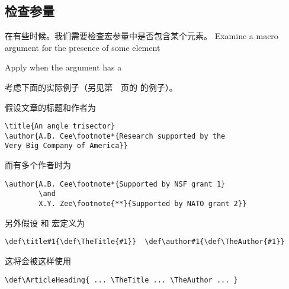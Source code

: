 \documentclass[letterpaper]{book}
\begin{document}
\subsection{检查参量}

在有些时候。我们需要检查宏参量中是否包含某个元素。
\howto Examine a macro argument for the presence of some element\par
\howto Apply  when the argument has a \par
考虑下面的实际例子（另见第~\pageref{left:display}~页的
 的例子）。

假设文章的标题和作者为
\begin{verbatim}
\title{An angle trisector}
\author{A.B. Cee\footnote*{Research supported by the
Very Big Company of America}}
\end{verbatim}
而有多个作者时为
\begin{verbatim}
\author{A.B. Cee\footnote*{Supported by NSF grant 1}
        \and
        X.Y. Zee\footnote{**}{Supported by NATO grant 2}}
\end{verbatim}
另外假设  和  宏定义为
\begin{verbatim}
\def\title#1{\def\TheTitle{#1}}  \def\author#1{\def\TheAuthor{#1}}
\end{verbatim}
这将会被这样使用
\begin{verbatim}
\def\ArticleHeading{ ... \TheTitle ... \TheAuthor ... }
\end{verbatim}
\end{document}
